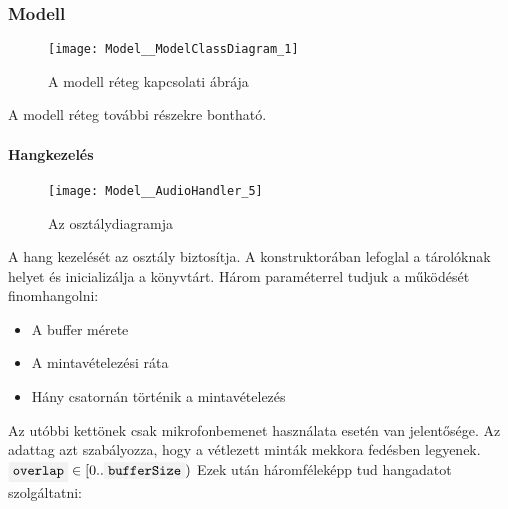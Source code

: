 \subsubsection{Modell}
\begin{figure}[h]
	\texttt{[image: Model\_\_ModelClassDiagram\_1]}
	\centering
	\caption{A modell r\'eteg kapcsolati \'abr\'aja}
\end{figure}
A modell r\'eteg tov\'abbi r\'eszekre bonthat\'o.

\paragraph{Hangkezel\'es}
\begin{figure}[h]
	\texttt{[image: Model\_\_AudioHandler\_5]}
	\centering
	\caption{Az  oszt\'alydiagramja}
\end{figure}
A hang kezel\'es\'et az  oszt\'aly biztos\'itja.
A konstruktor\'aban lefoglal a t\'arol\'oknak helyet \'es inicializ\'alja a  k\"onyvt\'art.
H\'arom param\'eterrel tudjuk a m\H uk\"od\'es\'et finomhangolni:
\begin{itemize}
	\item A buffer m\'erete
	\item A mintav\'etelez\'esi r\'ata
	\item H\'any csatorn\'an t\"ort\'enik a mintav\'etelez\'es
\end{itemize}
Az ut\'obbi kett\"onek csak mikrofonbemenet haszn\'alata eset\'en van jelent\H os\'ege.
Az  adattag azt szab\'alyozza, hogy a v\'etlezett mint\'ak mekkora fed\'esben legyenek. $\code{overlap}\in[0..\code{bufferSize})$
\newline
Ezek ut\'an h\'aromf\'elek\'epp tud hangadatot szolg\'altatni:

